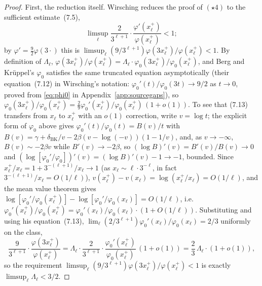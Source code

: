\documentclass[11pt]{article}
\theoremstyle{definition}
\theoremstyle{remark}
\begin{document}
\begin{proof}
First, the reduction itself. Wirsching reduces the proof of $(\star4)$ to the
sufficient estimate~(7.5),
\[
\limsup_\ell \frac{2}{3^{\ell+1}}\cdot\frac{\varphi'(x_\ell^+)}{\varphi(x_\ell^+)} < 1;
\]
by $\varphi'=\tfrac92\varphi(3\cdot)$ this is $\limsup_\ell (9/3^{\ell+1})\varphi(3x_\ell^+)/\varphi(x_\ell^+) <
1$. By definition of $\Lambda_\ell$,
$\varphi(3x_\ell^+)/\varphi(x_\ell^+) = \Lambda_\ell\cdot\varphi_0(3x_\ell^+)/\varphi_0(x_\ell^+)$, and Berg and
Kr\"uppel's $\varphi_0$ satisfies the same truncated equation asymptotically (their
equation~(7.12) in Wirsching's notation: $\varphi_0'(t)/\varphi_0(3t)\to9/2$ as $t\to0$, proved
from \eqref{eq:phi0} in Appendix~\ref{app:sourcegaps}), so
$\varphi_0(3x_\ell^+)/\varphi_0(x_\ell^+) = \tfrac29\varphi_0'(x_\ell^+)/\varphi_0(x_\ell^+)\,(1+o(1))$.
To see that (7.13) transfers from $x_\ell$ to $x_\ell^+$ with an $o(1)$ correction, write $v=\log t$; the
explicit form of $\varphi_0$ above gives $\varphi_0'(t)/\varphi_0(t) = B(v)/t$ with
$B(v) = \gamma+\delta_{\mathrm{BK}}/v-2\beta(v-\log(-v))(1-1/v)$, and, as $v\to-\infty$,
$B(v)\sim-2\beta v$ while $B'(v)\to-2\beta$, so $(\log B)'(v)=B'(v)/B(v)\to0$ and
$(\log[\varphi_0'/\varphi_0])'(v) = (\log B)'(v)-1 \to -1$, bounded. Since $x_\ell^+/x_\ell = 1+3^{-(\ell+1)}/x_\ell
\to 1$ (as $x_\ell\sim \ell\cdot3^{-\ell}$, in fact $3^{-(\ell+1)}/x_\ell=O(1/\ell)$), $v(x_\ell^+)-v(x_\ell)=\log(x_\ell^+/x_\ell)
=O(1/\ell)$, and the mean value theorem gives
$\log[\varphi_0'/\varphi_0(x_\ell^+)]-\log[\varphi_0'/\varphi_0(x_\ell)]=O(1/\ell)$, i.e.
$\varphi_0'(x_\ell^+)/\varphi_0(x_\ell^+)=\varphi_0'(x_\ell)/\varphi_0(x_\ell)\cdot(1+O(1/\ell))$. Substituting and
using his equation~(7.13),
$\lim_\ell(2/3^{\ell+1})\varphi_0'(x_\ell)/\varphi_0(x_\ell)=2/3$ uniformly on the class,
\[
\frac{9}{3^{\ell+1}}\cdot\frac{\varphi(3x_\ell^+)}{\varphi(x_\ell^+)}
= \Lambda_\ell\cdot\frac2{3^{\ell+1}}\cdot\frac{\varphi_0'(x_\ell^+)}{\varphi_0(x_\ell^+)}\,(1+o(1))
= \frac23\,\Lambda_\ell\cdot(1+o(1)),
\]
so the requirement $\limsup_\ell(9/3^{\ell+1})\varphi(3x_\ell^+)/\varphi(x_\ell^+)<1$ is exactly
$\limsup_\ell\Lambda_\ell<3/2$.


\end{proof}
\end{document}
